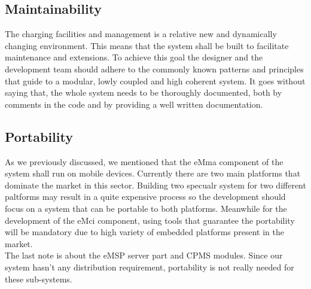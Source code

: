 \subsection{Maintainability}
The charging facilities and management is a relative new and dynamically changing environment. This means that the system shall be built to facilitate maintenance and extensions. To achieve this goal the designer and the development team should adhere to the commonly known patterns and principles that guide to a modular, lowly coupled and high coherent system. It goes without saying that, the whole system needs to be thoroughly documented, both by comments in the code and by providing a well written documentation.

\subsection{Portability}
As we previously discussed, we mentioned that the eMma component of the system shall run on mobile devices. Currently there are two main platforms that dominate the market in this sector. Building two specualr system for two different paltforms may result in a quite expensive process so the development should focus on a system that can be portable to both platforms. Meanwhile for the development of the eMci component, using tools that guarantee the portability will be mandatory due to high variety of embedded platforms present in the market.\\
The last note is about the eMSP server part and CPMS modules. Since our system hasn't any distribution requirement, portability is not really needed for these sub-systems.